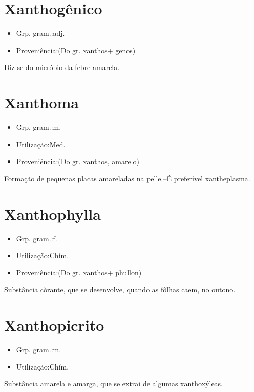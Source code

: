 \section{Xanthogênico}
\begin{itemize}
\item {Grp. gram.:adj.}
\end{itemize}
\begin{itemize}
\item {Proveniência:(Do gr. \textunderscore xanthos\textunderscore  + \textunderscore genos\textunderscore )}
\end{itemize}
Diz-se do micróbio da febre amarela.
\section{Xanthoma}
\begin{itemize}
\item {Grp. gram.:m.}
\end{itemize}
\begin{itemize}
\item {Utilização:Med.}
\end{itemize}
\begin{itemize}
\item {Proveniência:(Do gr. \textunderscore xanthos\textunderscore , amarelo)}
\end{itemize}
Formação de pequenas placas amareladas na pelle.--É preferível \textunderscore xantheplasma\textunderscore .
\section{Xanthophylla}
\begin{itemize}
\item {Grp. gram.:f.}
\end{itemize}
\begin{itemize}
\item {Utilização:Chím.}
\end{itemize}
\begin{itemize}
\item {Proveniência:(Do gr. \textunderscore xanthos\textunderscore  + \textunderscore phullon\textunderscore )}
\end{itemize}
Substância còrante, que se desenvolve, quando as fôlhas caem, no outono.
\section{Xanthopicrito}
\begin{itemize}
\item {Grp. gram.:m.}
\end{itemize}
\begin{itemize}
\item {Utilização:Chím.}
\end{itemize}
Substância amarela e amarga, que se extrai de algumas xanthoxýleas.

